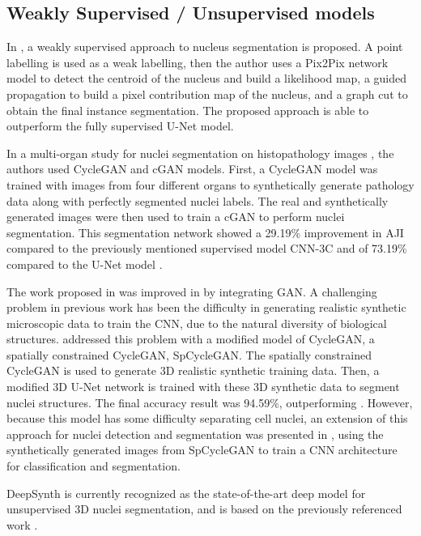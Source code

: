 \subsection{Weakly Supervised / Unsupervised models}

In \cite{weakly:GAN}, a weakly supervised approach to nucleus segmentation is proposed. A point labelling is used as a weak labelling, then the author uses a Pix2Pix network model to detect the centroid of the nucleus and build a likelihood map, a guided propagation to build a pixel contribution map of the nucleus, and a graph cut to obtain the final instance segmentation. The proposed approach is able to outperform the fully supervised U-Net \cite{Unet:2D} model.

In a multi-organ study for nuclei segmentation on histopathology images \cite{cGAN:cycleGAN}, the authors used CycleGAN and \ac{cGAN} models. First, a CycleGAN model was trained with images from four different organs to synthetically generate pathology data along with perfectly segmented nuclei labels. The real and synthetically generated images were then used to train a \ac{cGAN} to perform nuclei segmentation. This segmentation network showed a 29.19\% improvement in \ac{AJI} compared to the previously mentioned supervised model \ac{CNN}-3C \cite{CNN3} and of 73.19\% compared to the U-Net model \cite{Unet:2D}.


The work proposed in \cite{SOTA:3DCNN} was improved in \cite{3D:CycleGAN} by integrating \ac{GAN}. A challenging problem in previous work has been the difficulty in generating realistic synthetic microscopic data to train the \ac{CNN}, due to the natural diversity of biological structures. \citet{3D:CycleGAN} addressed this problem with a modified model of CycleGAN, a spatially constrained CycleGAN, SpCycleGAN. The spatially constrained CycleGAN is used to generate \ac{3D} realistic synthetic training data. Then, a modified \ac{3D} U-Net network is trained with these \ac{3D} synthetic data to segment nuclei structures. The final accuracy result was 94.59\%, outperforming \cite{SOTA:3DCNN}. However, because this model has some difficulty separating cell nuclei, an extension of this approach for nuclei detection and segmentation was presented in \cite{detection:3D}, using the synthetically generated images from SpCycleGAN to train a \ac{CNN} architecture for classification and segmentation.

DeepSynth \cite{deepsynth} is currently recognized as the state-of-the-art deep model for unsupervised \ac{3D} nuclei segmentation, and is based on the previously referenced work \cite{2dplus,SOTA:3DCNN,3D:CycleGAN}.

